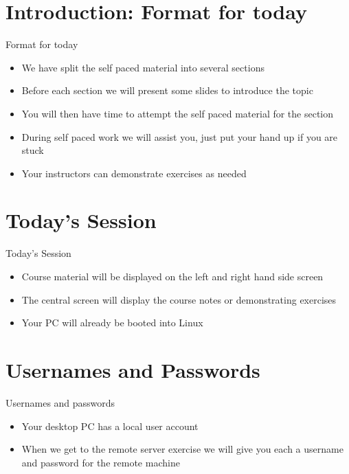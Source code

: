 \section{Introduction: Format for today}
\begin{frame}{Format for today}
\begin{itemize}
\item We have split the self paced material into several sections
\item Before each section we will present some slides to introduce the topic
\item You will then have time to attempt the self paced material for the section
\item During self paced work we will assist you, just put your hand up if you are stuck
\item Your instructors can demonstrate exercises as needed
\end{itemize}
\end{frame}

\section{Today's Session}
\begin{frame}{Today's Session}
\begin{itemize}
\item Course material will be displayed on the left and right hand side screen
\item The central screen will display the course notes or demonstrating exercises
\item Your PC will already be booted into Linux 
\end{itemize}
\end{frame}

\section{Usernames and Passwords}
\begin{frame}{Usernames and passwords}
\begin{itemize}
\item Your desktop PC has a local user account 
\item When we get to the remote server exercise we will give you each a username and password for the remote machine
\end{itemize}
\end{frame}

